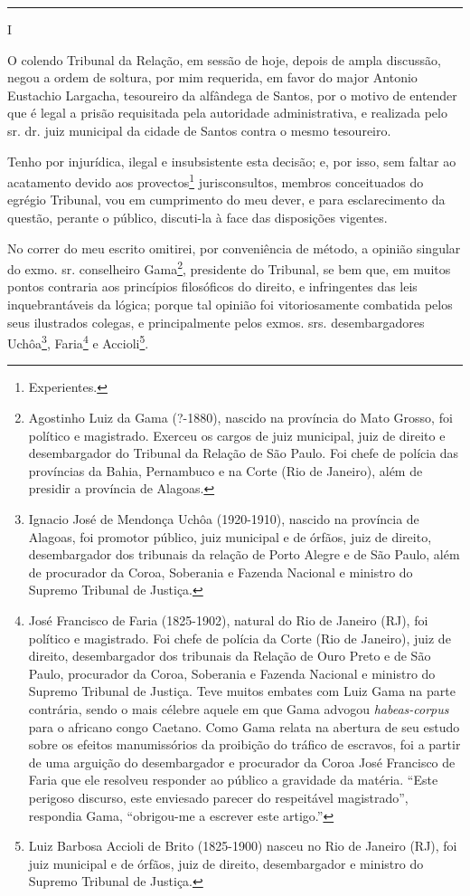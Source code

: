 \begin{center}\rule{0.5\linewidth}{\linethickness}\end{center}

I

O colendo Tribunal da Relação, em sessão de hoje, depois de ampla
discussão, negou a ordem de soltura, por mim requerida, em favor do
major Antonio Eustachio Largacha, tesoureiro da alfândega de Santos, por
o motivo de entender que é legal a prisão requisitada pela autoridade
administrativa, e realizada pelo sr. dr. juiz municipal da cidade de
Santos contra o mesmo tesoureiro.

Tenho por injurídica, ilegal e insubsistente esta decisão; e, por isso,
sem faltar ao acatamento devido aos provectos\footnote{Experientes.}
jurisconsultos, membros conceituados do egrégio Tribunal, vou em
cumprimento do meu dever, e para esclarecimento da questão, perante o
público, discuti-la à face das disposições vigentes.

No correr do meu escrito omitirei, por conveniência de método, a opinião
singular do exmo. sr. conselheiro Gama\footnote{Agostinho Luiz da Gama
  (?-1880), nascido na província do Mato Grosso, foi político e
  magistrado. Exerceu os cargos de juiz municipal, juiz de direito e
  desembargador do Tribunal da Relação de São Paulo. Foi chefe de
  polícia das províncias da Bahia, Pernambuco e na Corte (Rio de
  Janeiro), além de presidir a província de Alagoas.}, presidente do
Tribunal, se bem que, em muitos pontos contraria aos princípios
filosóficos do direito, e infringentes das leis inquebrantáveis da
lógica; porque tal opinião foi vitoriosamente combatida pelos seus
ilustrados colegas, e principalmente pelos exmos. srs. desembargadores
Uchôa\footnote{Ignacio José de Mendonça Uchôa (1920-1910), nascido na
  província de Alagoas, foi promotor público, juiz municipal e de
  órfãos, juiz de direito, desembargador dos tribunais da relação de
  Porto Alegre e de São Paulo, além de procurador da Coroa, Soberania e
  Fazenda Nacional e ministro do Supremo Tribunal de Justiça.},
Faria\footnote{José Francisco de Faria (1825-1902), natural do Rio de
  Janeiro (RJ), foi político e magistrado. Foi chefe de polícia da Corte
  (Rio de Janeiro), juiz de direito, desembargador dos tribunais da
  Relação de Ouro Preto e de São Paulo, procurador da Coroa, Soberania e
  Fazenda Nacional e ministro do Supremo Tribunal de Justiça. Teve
  muitos embates com Luiz Gama na parte contrária, sendo o mais célebre
  aquele em que Gama advogou \emph{habeas-corpus} para o africano congo
  Caetano. Como Gama relata na abertura de seu estudo sobre os efeitos
  manumissórios da proibição do tráfico de escravos, foi a partir de uma
  arguição do desembargador e procurador da Coroa José Francisco de
  Faria que ele resolveu responder ao público a gravidade da matéria.
  ``Este perigoso discurso, este enviesado parecer do respeitável
  magistrado'', respondia Gama, ``obrigou-me a escrever este artigo.''}
e Accioli\footnote{Luiz Barbosa Accioli de Brito (1825-1900) nasceu no
  Rio de Janeiro (RJ), foi juiz municipal e de órfãos, juiz de direito,
  desembargador e ministro do Supremo Tribunal de Justiça.}.


